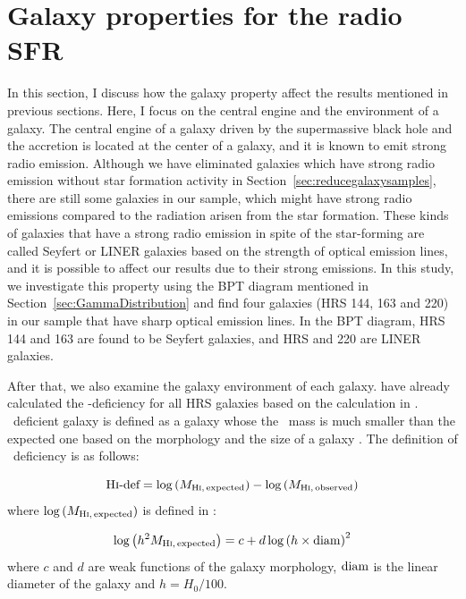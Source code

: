 \section{Galaxy properties for the radio SFR}\label{sec:galaxypropertiesfortheradiosfr}

In this section, I discuss how the galaxy property affect the results mentioned in previous sections.
Here, I focus on the central engine and the environment of a galaxy.
The central engine of a galaxy driven by the supermassive black hole and the accretion is located at the center of a galaxy, and it is known to emit strong radio emission.
Although we have eliminated galaxies which have strong radio emission without star formation activity in Section~\ref{sec:reducegalaxysamples}, there are still some galaxies in our sample, which might have strong radio emissions compared to the radiation arisen from the star formation.
These kinds of galaxies that have a strong radio emission in spite of the star-forming are called Seyfert or LINER galaxies based on the strength of optical emission lines, and it is possible to affect our results due to their strong emissions.
In this study, we investigate this property using the BPT diagram mentioned in Section~\ref{sec:GammaDistribution} and find four galaxies (HRS 144, 163 and 220) in our sample that have sharp optical emission lines.
In the BPT diagram, HRS 144 and 163 are found to be Seyfert galaxies, and HRS and 220 are LINER galaxies.

After that, we also examine the galaxy environment of each galaxy.
\citet{Boselli2014} have already calculated the \nh-deficiency for all HRS galaxies based on the calculation in \citet{Boselli2009}.
\nh~deficient galaxy is defined as a galaxy whose the \nh~mass is much smaller than the expected one based on the morphology and the size of a galaxy \citep{Haynes1984}.
The definition of \nh~deficiency is as follows:

\begin{equation}\label{eq:definitionofHIdeficiency}
    \text{H\textsc{i}-def} = \log\left(M_{\mathrm{H\textsc{i},\,expected}}\right) - \log\left(M_{\mathrm{H\textsc{i},\,observed}}\right)
\end{equation}
where $\log\left(M_{\mathrm{H\textsc{i},\,expected}}\right)$ is defined in \citet{Haynes1984}:

\begin{equation}\label{eq:definitionofexpectedHIdef}
    \log\left(h^2 M_{\mathrm{H\textsc{i},\,expected}}\right) = c + d\log\left(h\times\mathrm{diam}\right)^2
\end{equation}
where $c$ and $d$ are weak functions of the galaxy morphology, $\mathrm{diam}$ is the linear diameter of the galaxy and $h=H_0 / 100$.

